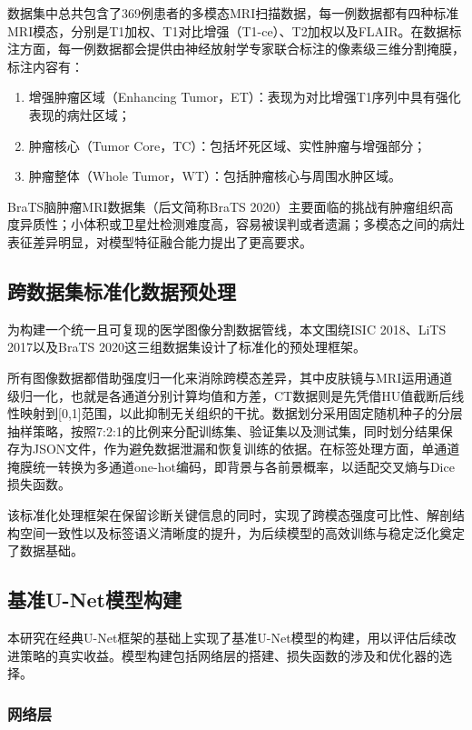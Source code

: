 数据集中总共包含了369例患者的多模态MRI扫描数据，每一例数据都有四种标准MRI模态，分别是T1加权、T1对比增强（T1-ce）、T2加权以及FLAIR。在数据标注方面，每一例数据都会提供由神经放射学专家联合标注的像素级三维分割掩膜，标注内容有：

\begin{enumerate}
    \item 增强肿瘤区域（Enhancing Tumor，ET）：表现为对比增强T1序列中具有强化表现的病灶区域；
    \item 肿瘤核心（Tumor Core，TC）：包括坏死区域、实性肿瘤与增强部分；
    \item 肿瘤整体（Whole Tumor，WT）：包括肿瘤核心与周围水肿区域。
\end{enumerate}

BraTS脑肿瘤MRI数据集（后文简称BraTS 2020）主要面临的挑战有肿瘤组织高度异质性；小体积或卫星灶检测难度高，容易被误判或者遗漏；多模态之间的病灶表征差异明显，对模型特征融合能力提出了更高要求。

\subsection{跨数据集标准化数据预处理}

为构建一个统一且可复现的医学图像分割数据管线，本文围绕ISIC 2018、LiTS 2017以及BraTS 2020这三组数据集设计了标准化的预处理框架。

所有图像数据都借助强度归一化来消除跨模态差异，其中皮肤镜与MRI运用通道级归一化，也就是各通道分别计算均值和方差，CT数据则是先凭借HU值截断后线性映射到[0,1]范围，以此抑制无关组织的干扰。数据划分采用固定随机种子的分层抽样策略，按照7:2:1的比例来分配训练集、验证集以及测试集，同时划分结果保存为JSON文件，作为避免数据泄漏和恢复训练的依据。在标签处理方面，单通道掩膜统一转换为多通道one-hot编码，即背景与各前景概率，以适配交叉熵与Dice损失函数。

该标准化处理框架在保留诊断关键信息的同时，实现了跨模态强度可比性、解剖结构空间一致性以及标签语义清晰度的提升，为后续模型的高效训练与稳定泛化奠定了数据基础。

\subsection{基准U-Net模型构建}

本研究在经典U-Net框架的基础上实现了基准U-Net模型的构建，用以评估后续改进策略的真实收益。模型构建包括网络层的搭建、损失函数的涉及和优化器的选择。

\subsubsection{网络层}

